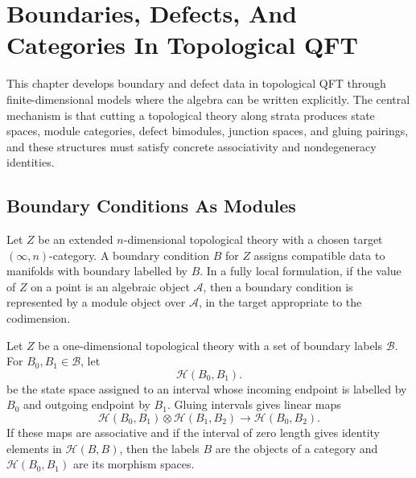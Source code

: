 \chapter{Boundaries, Defects, And Categories In Topological QFT}
\label{ch:tqft-boundaries-defects-categories}

\ConventionsEuclidean

This chapter develops boundary and defect data in topological QFT through
finite-dimensional models where the algebra can be written explicitly.  The
central mechanism is that cutting a topological theory along strata produces
state spaces, module categories, defect bimodules, junction spaces, and
gluing pairings, and these structures must satisfy concrete associativity and
nondegeneracy identities.

\section{Boundary Conditions As Modules}

Let \(Z\) be an extended \(n\)-dimensional topological theory with a chosen
target \((\infty,n)\)-category.  A boundary condition \(B\) for \(Z\) assigns
compatible data to manifolds with boundary labelled by \(B\).  In a fully
local formulation, if the value of \(Z\) on a point is an algebraic object
\(\mathcal A\), then a boundary condition is represented by a module object
over \(\mathcal A\), in the target appropriate to the codimension.

\begin{definition}
\label{def:tqft-boundary-category}
Let \(Z\) be a one-dimensional topological theory with a set of boundary
labels \(\mathcal B\).  For \(B_0,B_1\in\mathcal B\), let
\[
  \mathcal H(B_0,B_1).
\]
be the state space assigned to an interval whose incoming endpoint is
labelled by \(B_0\) and outgoing endpoint by \(B_1\).  Gluing intervals gives
linear maps
\[
  \mathcal H(B_0,B_1)\otimes \mathcal H(B_1,B_2)
  \longrightarrow
  \mathcal H(B_0,B_2).
\]
If these maps are associative and if the interval of zero length gives
identity elements in \(\mathcal H(B,B)\), then the labels \(B\) are the
objects of a category and \(\mathcal H(B_0,B_1)\) are its morphism spaces.
\end{definition}


